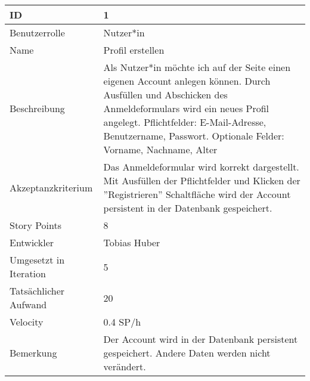 \begin{tabularx}{\textwidth}{|p{}|X|}
		\hline
		ID & 1 \\
		\hline
		Benutzerrolle & Nutzer*in \\
		\hline
		Name & Profil erstellen \\
		\hline
		Beschreibung & Als Nutzer*in möchte ich auf der Seite einen eigenen Account anlegen können. Durch Ausfüllen und Abschicken des Anmeldeformulars wird ein neues Profil angelegt.  Pflichtfelder:
		E-Mail-Adresse,
		Benutzername,
		Passwort.
		Optionale Felder:
		Vorname,
		Nachname,
		Alter \\
		\hline
		Akzeptanzkriterium & Das Anmeldeformular wird korrekt dargestellt. Mit Ausfüllen der Pflichtfelder und Klicken der ''Registrieren'' Schaltfläche  wird der Account persistent in der Datenbank gespeichert. \\
		\hline
		Story Points & 8 \\
		\hline
		Entwickler & Tobias Huber \\
		\hline
		Umgesetzt in Iteration & 5 \\
		\hline
		Tatsächlicher Aufwand & 20 \\
		\hline
		Velocity & 0.4 SP/h \\
		\hline
		Bemerkung &  Der Account wird in der Datenbank persistent gespeichert. Andere Daten werden nicht verändert.\\
		\hline
\end{tabularx}
\vspace{20pt}
